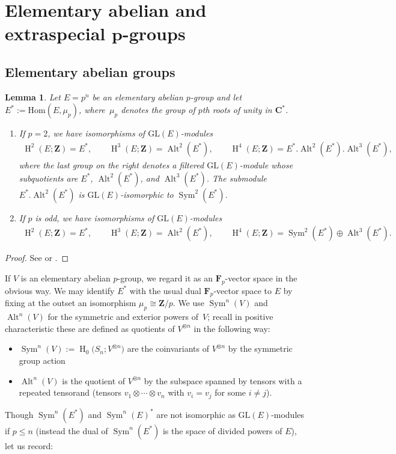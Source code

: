 \documentclass[pdftex]{sigma}
\numberwithin{equation}{section}
\newtheorem{Lemma}[Theorem]{Lemma}
\newcommand\bC{\mathbf C}
\newcommand\bF{\mathbf F}
\newcommand\bZ{\mathbf Z}
\DeclareMathOperator\homology{H}
\renewcommand\H{\homology}
\newcommand\<\langle
\renewcommand\>\rangle
\DeclareMathOperator\Sym{Sym}
\DeclareMathOperator\Alt{Alt}
\newcommand{\GL}{\mathrm{GL}}
\newcommand{\Hom}{\mathrm{Hom}}
\begin{document}
\section[Elementary abelian and extraspecial $p$-groups]{Elementary abelian and extraspecial $\boldsymbol{p}$-groups} \label{sec p-groups}

\subsection{Elementary abelian groups}\label{subsec:eag}

\begin{Lemma} \label{elemab}Let $E = p^n$ be an elementary abelian $p$-group and let $E^*:=\Hom(E,\mu_p)$, where~$\mu_p$ denotes the group of $p$th roots of unity in $\bC^*$.
\begin{enumerate}\itemsep=0pt
\item[$1.$] If $p = 2$, we have isomorphisms of $\GL(E)$-modules
\begin{gather*}
\H^2(E;\bZ) = E^*, \qquad \H^3(E;\bZ) = \Alt^2(E^*), \qquad \H^4(E;\bZ) = E^*.\Alt^2(E^*).\Alt^3(E^*),
\end{gather*}
where the last group on the right denotes a filtered $\GL(E)$-module whose subquotients are
 $E^*$, $\Alt^2(E^*)$, and $\Alt^3(E^*)$. The submodule $E^*.\Alt^2(E^*)$ is $\GL(E)$-isomorphic to $\Sym^2(E^*)$.
\item[$2.$] If $p$ is odd, we have isomorphisms of $\GL(E)$-modules
\begin{gather*}
\H^2(E;\bZ) = E^*, \qquad \H^3(E;\bZ) = \Alt^2(E^*), \qquad \H^4(E;\bZ) = \Sym^2(E^*) \oplus \Alt^3(E^*).
\end{gather*}
\end{enumerate}
\end{Lemma}

\begin{proof}See \cite[Proposition 2.2]{MR2320456} or \cite[Lemma 4.4]{jft}.
\end{proof}

If $V$ is an elementary abelian $p$-group, we regard it as an $\bF_p$-vector space in the obvious way. We may identify $E^*$ with the usual dual $\bF_p$-vector space to $E$ by fixing at the outset an isomorphism $\mu_p \cong \bZ/p$. We use $\Sym^n(V)$ and $\Alt^n(V)$ for the symmetric and exterior powers of~$V$; recall in positive characteristic these are defined as quotients of $V^{\otimes n}$ in the following way:
\begin{itemize}\itemsep=0pt
\item $\Sym^n(V):= \H_0\big(S_n;V^{\otimes n}\big)$ are the coinvariants of $V^{\otimes n}$ by the symmetric group action
\item $\Alt^n(V)$ is the quotient of $V^{\otimes n}$ by the subspace spanned by tensors with a repeated tensorand (tensors $v_1 \otimes \cdots \otimes v_n$ with $v_i = v_j$ for some $i \neq j$).
\end{itemize}
Though $\Sym^n(E^*)$ and $\Sym^n(E)^*$ are not isomorphic as $\GL(E)$-modules if $p \leq n$ (instead the dual of $\Sym^n(E^*)$ is the space of divided powers of $E$), let us record:
\end{document}
